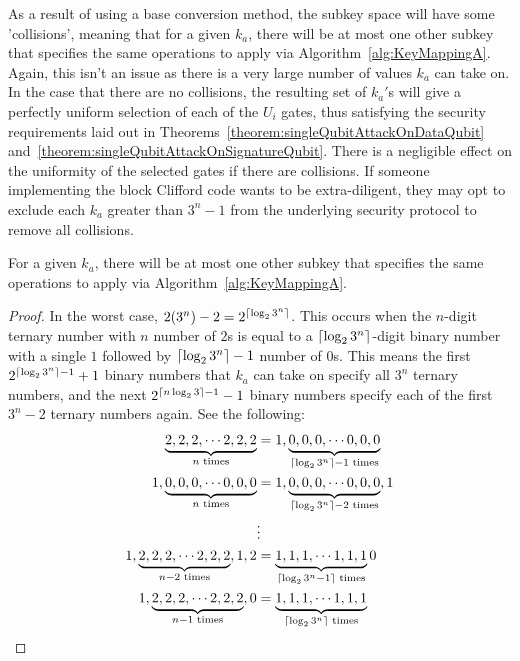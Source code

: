 As a result of using a base conversion method, the subkey space will have some 'collisions', meaning that for a given $k_a$, there will be at most one other subkey that specifies the same operations to apply via Algorithm~\ref{alg:KeyMappingA}. Again, this isn't an issue as there is a very large number of values $k_a$ can take on. In the case that there are no collisions, the resulting set of $k_a'$s will give a perfectly uniform selection of each of the $U_i$ gates, thus satisfying the security requirements laid out in Theorems~\ref{theorem:singleQubitAttackOnDataQubit} and~\ref{theorem:singleQubitAttackOnSignatureQubit}. There is a negligible effect on the uniformity of the selected gates if there are collisions. If someone implementing the block Clifford code wants to be extra-diligent, they may opt to exclude each $k_a$ greater than $3^n - 1$ from the underlying security protocol to remove all collisions.

\begin{theorem}
\label{theorem:collisionForMappingA}
For a given $k_a$, there will be at most one other subkey that specifies the same operations to apply via Algorithm~\ref{alg:KeyMappingA}.
\end{theorem}
\begin{proof}
In the worst case, $2(3^n) - 2 = 2^{\lceil\log_2 3^n\rceil}$. This occurs when the $n$-digit ternary number with $n$ number of $2$s is equal to a $\lceil\log_2 3^n\rceil$-digit binary number with a single $1$ followed by $\lceil\log_2 3^n\rceil - 1$ number of $0$s. This means the first $2^{\lceil\log_2 3^n\rceil - 1} + 1$ binary numbers that $k_a$ can take on specify all $3^n$ ternary numbers, and the next $2^{\lceil n \log_2 3\rceil - 1} - 1$ binary numbers specify each of the first $3^n - 2$ ternary numbers again. See the following:
\begin{align}
\underbrace{2, 2, 2, \cdots 2,2,2}_{n \text{ times}} &= 1, \underbrace{0, 0, 0, \cdots 0,0,0}_{\lceil\log_2 3^n\rceil - 1 \text{ times}}\\
1,\underbrace{0, 0, 0, \cdots 0,0,0}_{n \text{ times}} &= 1, \underbrace{0, 0, 0, \cdots 0,0,0}_{\lceil\log_2 3^n\rceil - 2 \text{ times}}, 1\\
& \vdots \nonumber \\
1, \underbrace{2, 2, 2, \cdots 2,2,2}_{n-2 \text{ times}}, 1,2 &= \underbrace{1, 1, 1, \cdots 1,1,1}_{\lceil\log_2 3^n - 1\rceil\text{ times}} 0\\
1, \underbrace{2, 2, 2, \cdots 2,2,2}_{n-1 \text{ times}}, 0 &= \underbrace{1, 1, 1, \cdots 1,1,1}_{\lceil\log_2 3^n\rceil\text{ times}}
\end{align}
\end{proof}

